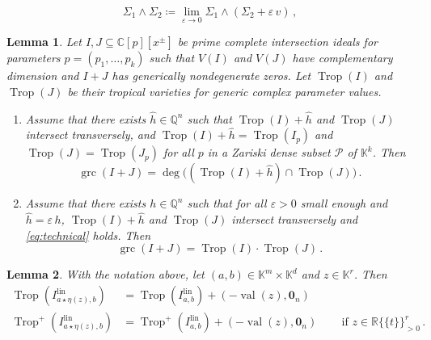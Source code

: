 \documentclass[10pt,a4paper]{amsart}
\newtheorem{lemma}{Lemma}
\newcommand{\CC}{\mathbb{C}}
\newcommand{\QQ}{\mathbb{Q}}
\newcommand{\RRt}{\mathbb{R}\{\!\{t\}\!\}}
\DeclareMathOperator{\Trop}{Trop}
\DeclareMathOperator{\grc}{grc}
\newcommand{\lin}{{\mathrm{lin}}}
\DeclareMathOperator{\val}{val}
\begin{document}
  \begin{equation}\label{eq:shift}
    \Sigma_1\wedge\Sigma_2\coloneqq \lim_{\varepsilon\rightarrow 0} \Sigma_1\wedge (\Sigma_2+\varepsilon\, v)\,,
  \end{equation}

\begin{lemma}\label{lem:technical}
Let $I,J\subseteq \CC[p][x^\pm]$ be prime  complete intersection ideals for parameters $p=(p_1,\dots,p_k)$ 
such that $V(I)$ and $V(J)$ have complementary dimension and $I+J$ has generically nondegenerate zeros. Let $\Trop(I)$ and $\Trop(J)$ be their tropical varieties for generic complex parameter values. 
\begin{enumerate}[label=(\roman*)]
    \item Assume that there exists $\hat{h}\in \QQ^n$ such that $\Trop(I)+\hat{h}$ and $\Trop(J)$ intersect transversely,  and $\Trop(I)+\hat{h}=\Trop(I_p)$ and $\Trop(J)=\Trop(J_p)$ for all $p$ in a  Zariski dense subset $\mathcal{P}$ of $\mathbb{K}^k$.
Then
\begin{equation}\label{eq:technical}
\grc(I+J)= \deg\big((\Trop(I)+\hat{h}) \cap \Trop(J)\big) \, .
\end{equation}
\item Assume that there exists $h\in \QQ^n$ such that for all $\varepsilon>0$ small enough and
$\hat{h} = \varepsilon \, h$,  
$\Trop(I)+\hat{h}$ and $\Trop(J)$ intersect transversely and \eqref{eq:technical} holds. Then
\[ \grc(I+J) = \Trop(I) \cdot \Trop(J)\, . \]
\end{enumerate}
\end{lemma}

\begin{lemma}\label{lem:nu}
    With the notation above, let $(a,b)\in \mathbb{K}^m \times \mathbb{K}^d$ and $z\in \mathbb{K}^r$. Then
    \begin{align*}
    \Trop(I^{\lin}_{a\star \eta(z), b}) & = \Trop(I^{\lin}_{a,b}) + (-\val(z),\mathbf{0}_n)  \\ 
    \Trop^+(I^{\lin}_{a\star \eta(z), b}) & = \Trop^+(I^{\lin}_{a,b}) + (-\val(z),\mathbf{0}_n) \, \qquad  \text{if }z\in \RRt^r_{>0}\,.
    \end{align*}
\end{lemma}
\end{document}
